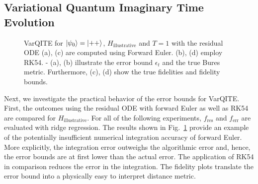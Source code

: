 \documentclass[twocolumn, aps, pra, superscriptaddress]{revtex4-1}
\begin{document}
\subsection{Variational Quantum Imaginary Time Evolution}
\begin{figure}[!ht]
    \centering
    \captionsetup{singlelinecheck = false, format= hang,justification=centerlast, font=footnotesize, labelsep=space}
    \caption{VarQITE for $\ket{\psi_0}=\ket{++}$, $H_{\text{illustrative}}$ and $T=1$  with the residual ODE  (a), (c) are computed using Forward Euler. (b), (d) employ  RK54. - (a), (b) illustrate the error bound $\epsilon_{t}$ and the true Bures metric. Furthermore, (c), (d) show the true fidelities and fidelity bounds.}
\label{fig:illustrative_qite}
\end{figure}
Next, we investigate the practical behavior of the error bounds for VarQITE.
First, the outcomes using the residual ODE with forward Euler as well as RK54 are compared for $H_{\text{illustrative}}$. For all of the following experiments, $f_{\text{res}}$ and $f_{\text{err}}$ are evaluated with ridge regression.
The results shown in Fig.~\ref{fig:illustrative_qite} provide an example of the potentially insufficient numerical integration accuracy of forward Euler. More explicitly, the integration error outweighs the algorithmic error and, hence, the error bounds are at first lower than the actual error. The application of RK54 in comparison reduces the error in the integration. The fidelity plots translate the error bound into a physically easy to interpret distance metric.
\end{document}

